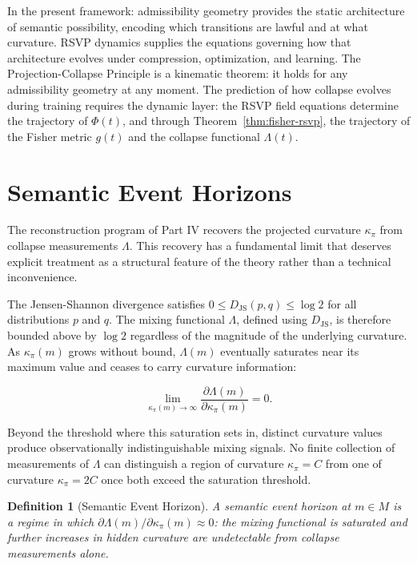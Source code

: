 \documentclass[12pt, oneside]{book}
\theoremstyle{plain-flyxion}
\theoremstyle{definition-flyxion}
\newtheorem{definition}[theorem]{Definition}
\newcommand{\kpi}{\kappa_{\pi}}
\newcommand{\Lam}{\Lambda}
\begin{document}
In the present framework: admissibility geometry provides the static architecture of
semantic possibility, encoding which transitions are lawful and at what curvature.
RSVP dynamics supplies the equations governing how that architecture evolves under
compression, optimization, and learning. The Projection-Collapse Principle is a kinematic
theorem: it holds for any admissibility geometry at any moment. The prediction of how
collapse evolves during training requires the dynamic layer: the RSVP field equations
determine the trajectory of $\Phi(t)$, and through Theorem~\ref{thm:fisher-rsvp},
the trajectory of the Fisher metric $g(t)$ and the collapse functional $\Lam(t)$.

\section{Semantic Event Horizons}

The reconstruction program of Part IV recovers the projected curvature $\kpi$ from
collapse measurements $\Lam$. This recovery has a fundamental limit that deserves
explicit treatment as a structural feature of the theory rather than a technical
inconvenience.

The Jensen-Shannon divergence satisfies $0 \leq D_{\mathrm{JS}}(p, q) \leq \log 2$ for
all distributions $p$ and $q$. The mixing functional $\Lam$, defined using
$D_{\mathrm{JS}}$, is therefore bounded above by $\log 2$ regardless of the magnitude of
the underlying curvature. As $\kpi(m)$ grows without bound, $\Lam(m)$ eventually
saturates near its maximum value and ceases to carry curvature information:

\begin{equation}\label{eq:event-horizon}
\lim_{\kpi(m) \to \infty} \frac{\partial \Lam(m)}{\partial \kpi(m)} = 0.
\end{equation}

Beyond the threshold where this saturation sets in, distinct curvature values produce
observationally indistinguishable mixing signals. No finite collection of measurements
of $\Lam$ can distinguish a region of curvature $\kpi = C$ from one of curvature
$\kpi = 2C$ once both exceed the saturation threshold.

\begin{definition}[Semantic Event Horizon]\label{def:event-horizon}
A \emph{semantic event horizon} at $m \in M$ is a regime in which $\partial\Lam(m)/
\partial\kpi(m) \approx 0$: the mixing functional is saturated and further increases in
hidden curvature are undetectable from collapse measurements alone.
\end{definition}
\end{document}
